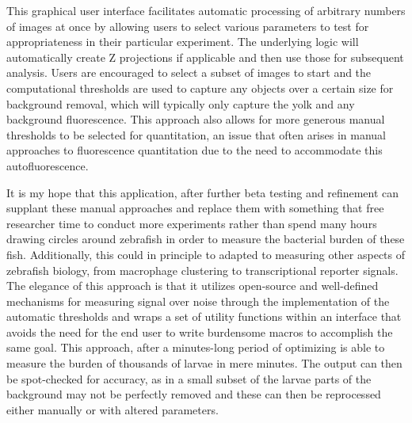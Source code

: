This graphical user interface facilitates automatic processing of arbitrary numbers of images at once by allowing users to select various parameters to test for appropriateness in their particular experiment. The underlying logic will automatically create Z projections if applicable and then use those for subsequent analysis. Users are encouraged to select a subset of images to start and the computational thresholds are used to capture any objects over a certain size for background removal, which will typically only capture the yolk and any background fluorescence. This approach also allows for more generous manual thresholds to be selected for quantitation, an issue that often arises in manual approaches to fluorescence quantitation due to the need to accommodate this autofluorescence. 

It is my hope that this application, after further beta testing and refinement can supplant these manual approaches and replace them with something that free researcher time to conduct more experiments rather than spend many hours drawing circles around zebrafish in order to measure the bacterial burden of these fish. Additionally, this could in principle to adapted to measuring other aspects of zebrafish biology, from macrophage clustering to transcriptional reporter signals. The elegance of this approach is that it utilizes open-source and well-defined mechanisms for measuring signal over noise through the implementation of the automatic thresholds and wraps a set of utility functions within an interface that avoids the need for the end user to write burdensome macros to accomplish the same goal. This approach, after a minutes-long period of optimizing is able to measure the burden of thousands of larvae in mere minutes. The output can then be spot-checked for accuracy, as in a small subset of the larvae parts of the background may not be perfectly removed and these can then be reprocessed either manually or with altered parameters. 


